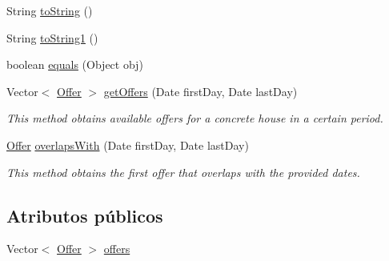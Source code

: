 \begin{DoxyCompactItemize}
\item 
String \mbox{\hyperlink{classdomain_1_1_rural_house_a2937650ac9e726b75be724d264fa1bee}{to\+String}} ()
\item 
String \mbox{\hyperlink{classdomain_1_1_rural_house_a10df7233cd8c6c42ed2d530b5357f64e}{to\+String1}} ()
\item 
boolean \mbox{\hyperlink{classdomain_1_1_rural_house_a92f3f1fa5d605f34e95f4e4175ef2629}{equals}} (Object obj)
\item 
Vector$<$ \mbox{\hyperlink{classdomain_1_1_offer}{Offer}} $>$ \mbox{\hyperlink{classdomain_1_1_rural_house_abe770c8a0fbcfed83a358d84bacd66f7}{get\+Offers}} (Date first\+Day, Date last\+Day)
\begin{DoxyCompactList}\small\item\em This method obtains available offers for a concrete house in a certain period. \end{DoxyCompactList}\item 
\mbox{\hyperlink{classdomain_1_1_offer}{Offer}} \mbox{\hyperlink{classdomain_1_1_rural_house_ac5596b06728d8bf377993088520fbc9e}{overlaps\+With}} (Date first\+Day, Date last\+Day)
\begin{DoxyCompactList}\small\item\em This method obtains the first offer that overlaps with the provided dates. \end{DoxyCompactList}\end{DoxyCompactItemize}
\subsection*{Atributos públicos}
\begin{DoxyCompactItemize}
\item 
Vector$<$ \mbox{\hyperlink{classdomain_1_1_offer}{Offer}} $>$ \mbox{\hyperlink{classdomain_1_1_rural_house_a3988c813bc7b8918e515b161bc3cdd20}{offers}}
\end{DoxyCompactItemize}

